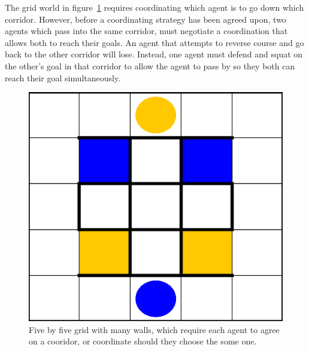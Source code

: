 \documentclass[letterpaper]{article}
\begin{document}
The grid world in figure~\ref{fig:fivebyfivewalls} requires coordinating which agent is to go down which corridor. However, before a coordinating strategy has been agreed upon, two agents which pass into the same corridor, must negotiate a coordination that allows both to reach their goals. An agent that attempts to reverse course and go back to the other corridor will lose. Instead, one agent must defend and squat on the other's goal in that corridor to allow the agent to pass by so they both can reach their goal simultaneously.	

\begin{figure}
\centering
\includegraphics[width=0.8\columnwidth]{figures/fivebyfivewalls.png}
\caption{Five by five grid with many walls, which require each agent to agree on a cooridor, or coordinate should they choose the some one.}
\label{fig:fivebyfivewalls}
\end{figure}
\end{document}
